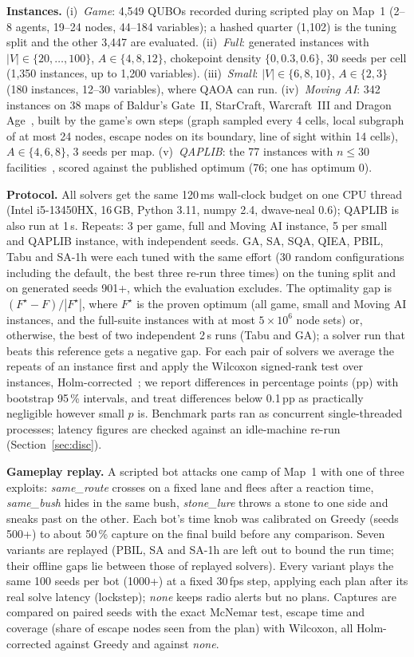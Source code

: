 \documentclass[sigconf]{acmart}
\begin{document}
\textbf{Instances.} (i)~\emph{Game}: 4{,}549 QUBOs recorded during scripted play on Map~1 (2--8 agents,
19--24 nodes, 44--184 variables); a hashed quarter (1{,}102) is the tuning split and the other
3{,}447 are evaluated. (ii)~\emph{Full}: generated instances with $|V|\in\{20,\dots,100\}$,
$A\in\{4,8,12\}$, chokepoint density $\{0,0.3,0.6\}$, 30 seeds per cell (1{,}350 instances, up to
1{,}200 variables). (iii)~\emph{Small}: $|V|\in\{6,8,10\}$, $A\in\{2,3\}$ (180 instances, 12--30
variables), where QAOA can run. (iv)~\emph{Moving AI}: 342 instances on 38 maps of Baldur's Gate~II, StarCraft, Warcraft~III and
Dragon Age~\cite{Sturtevant2012}, built by the game's own steps (graph sampled every 4 cells,
local subgraph of at most 24 nodes, escape nodes on its boundary, line of sight within 14 cells),
$A\in\{4,6,8\}$, 3 seeds per map. (v)~\emph{QAPLIB}: the 77 instances with $n\le30$
facilities~\cite{Burkard1997}, scored against the published optimum (76; one has optimum 0).

\textbf{Protocol.} All solvers get the same 120\,ms wall-clock budget on one CPU thread (Intel
i5-13450HX, 16\,GB, Python 3.11, numpy 2.4, dwave-neal 0.6); QAPLIB is also run at 1\,s. Repeats:
3 per game, full and Moving AI instance, 5 per small and QAPLIB instance, with independent seeds.
GA, SA, SQA, QIEA, PBIL, Tabu and SA-1h were each tuned with the same effort (30 random
configurations including the default, the best three re-run three times) on the tuning split and
on generated seeds 901+, which the evaluation excludes. The optimality gap is
$(F^\star-F)/|F^\star|$, where $F^\star$ is the proven optimum (all game, small and Moving AI
instances, and the full-suite instances with at most $5\times10^6$ node sets) or, otherwise,
the best of two independent 2\,s runs (Tabu and GA); a solver run that beats this reference gets a
negative gap. For each pair of solvers we average the repeats of an instance first and apply the
Wilcoxon signed-rank test over instances, Holm-corrected~\cite{Holm1979}; we report differences in
percentage points (pp) with bootstrap 95\,\% intervals, and treat differences below 0.1\,pp as
practically negligible however small $p$ is. Benchmark parts ran as concurrent single-threaded processes; latency figures are
checked against an idle-machine re-run (Section~\ref{sec:disc}).

\textbf{Gameplay replay.} A scripted bot attacks one camp of Map~1 with one of three exploits:
\emph{same\_route} crosses on a fixed lane and flees after a reaction time, \emph{same\_bush} hides in
the same bush, \emph{stone\_lure} throws a stone to one side and sneaks past on the other. Each
bot's time knob was calibrated on Greedy (seeds 500+) to about 50\,\% capture on the final build
before any comparison. Seven variants are replayed (PBIL, SA and SA-1h are left out to bound the
run time; their offline gaps lie between those of replayed solvers). Every variant plays the same
100 seeds per bot (1000+) at a fixed 30\,fps step, applying each plan after its real solve latency (lockstep); \emph{none} keeps radio alerts
but no plans. Captures are compared on paired seeds with the exact McNemar test, escape time and
coverage (share of escape nodes seen from the plan) with Wilcoxon, all Holm-corrected against
Greedy and against \emph{none}.
\end{document}
